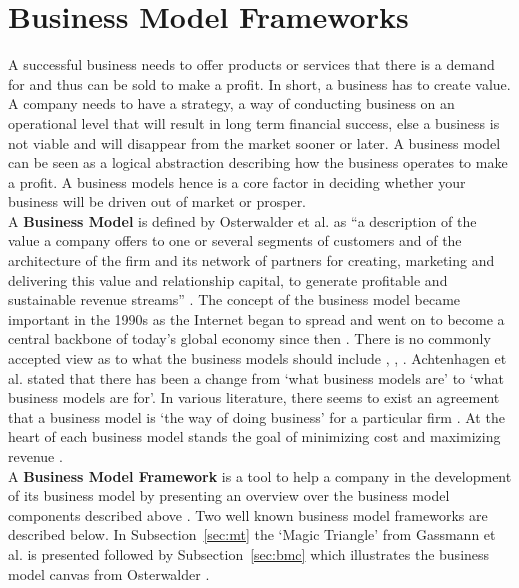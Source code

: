 \section{Business Model Frameworks}
\label{sec:bmf}	
\vspace{-1em}
	A successful business needs to offer products or services that there is a demand for and thus can be sold to make a profit. In short, a business has to create value. A company needs to have a strategy, a way of conducting business on an operational level that will result in long term financial success, else a business is not viable and will disappear from the market sooner or later.
	A business model can be seen as a logical abstraction describing how the business operates to make a profit. A business models hence is a core factor in deciding whether your business will be driven out of market or prosper.\\
	A \textbf{Business Model} is defined by Osterwalder et al. as ``a description of the value a company offers to one or several segments of customers and of the architecture of the firm and its network of partners for creating, marketing and delivering this value and relationship capital, to generate profitable and sustainable revenue streams'' \cite{osterwalder2005}. The concept of the business model became important in the 1990s as the Internet began to spread and went on to become a central backbone of today's global economy since then \cite{zott}. There is no commonly accepted view as to what the business models should include \cite{morris}, \cite{osterwalder2005}, \cite{schweizer}. Achtenhagen et al. \cite{achtenhagen} stated that there has been a change from `what business models are' to `what business models are for'. In various literature, there seems to exist an agreement that a business model is `the way of doing business' for a particular firm \cite{westerlund}. At the heart of each business model stands the goal of minimizing cost and maximizing revenue \cite{ju}.\\
	A \textbf{Business Model Framework} is a tool to help a company in the development of its business model by presenting an overview over the business model components described above \cite{dijkman}. Two well known business model frameworks are described below. In Subsection~\ref{sec:mt} the `Magic Triangle' from Gassmann et al. \cite{gassmann55} is presented followed by Subsection~\ref{sec:bmc} which illustrates the business model canvas from Osterwalder \cite{osterwalder}.
	\vspace{-1em}

